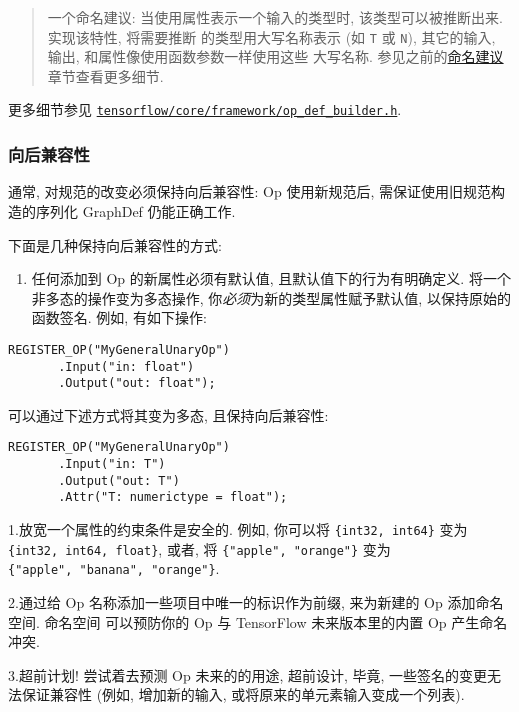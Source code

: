 \begin{quote}
一个命名建议: 当使用属性表示一个输入的类型时, 该类型可以被推断出来.
实现该特性, 将需要推断 的类型用大写名称表示 (如 \texttt{T} 或
\texttt{N}), 其它的输入, 输出, 和属性像使用函数参数一样使用这些
大写名称.
参见之前的\protect\hyperlink{naming}{命名建议}章节查看更多细节.
\end{quote}

更多细节参见
\href{https://tensorflow.googlesource.com/tensorflow/+/master/tensorflow/core/framework/op_def_builder.h}{\texttt{tensorflow/core/framework/op\_def\_builder.h}}.

\subsubsection{向后兼容性 }\label{ux5411ux540eux517cux5bb9ux6027}

通常, 对规范的改变必须保持向后兼容性: Op 使用新规范后,
需保证使用旧规范构造的序列化 GraphDef 仍能正确工作.

下面是几种保持向后兼容性的方式:

\begin{enumerate}
\def\labelenumi{\arabic{enumi}.}
\tightlist
\item
  任何添加到 Op 的新属性必须有默认值, 且默认值下的行为有明确定义.
  将一个非多态的操作变为多态操作, 你\emph{必须}为新的类型属性赋予默认值,
  以保持原始的函数签名. 例如, 有如下操作:
\end{enumerate}

\begin{verbatim}
REGISTER_OP("MyGeneralUnaryOp")
       .Input("in: float")
       .Output("out: float");
\end{verbatim}

可以通过下述方式将其变为多态, 且保持向后兼容性:

\begin{verbatim}
REGISTER_OP("MyGeneralUnaryOp")
       .Input("in: T")
       .Output("out: T")
       .Attr("T: numerictype = float");
\end{verbatim}

1.放宽一个属性的约束条件是安全的. 例如, 你可以将
\texttt{\{int32,\ int64\}} 变为 \texttt{\{int32,\ int64,\ float\}},
或者, 将 \texttt{\{"apple",\ "orange"\}} 变为
\texttt{\{"apple",\ "banana",\ "orange"\}}.

2.通过给 Op 名称添加一些项目中唯一的标识作为前缀, 来为新建的 Op
添加命名空间. 命名空间 可以预防你的 Op 与 TensorFlow 未来版本里的内置 Op
产生命名冲突.

3.超前计划! 尝试着去预测 Op 未来的的用途, 超前设计, 毕竟,
一些签名的变更无法保证兼容性 (例如, 增加新的输入,
或将原来的单元素输入变成一个列表).

